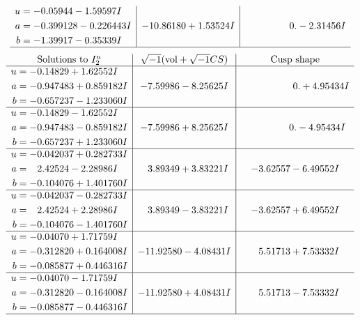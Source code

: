 \documentclass[1p]{elsarticle_modified}
\theoremstyle{definition}
\newcommand{\I}{\sqrt{-1}}
\begin{document}
$$\begin{array}{c|c|c}
\begin{aligned}
u &= -0.05944 - 1.59597 I \\
a &= -0.399128 - 0.226443 I \\
b &= -1.39917 - 0.35339 I\end{aligned}
 & -10.86180 + 1.53524 I & \phantom{-0.000000 } 0. - 2.31456 I\\
 \hline 
 \end{array}$$\newpage$$\begin{array}{c|c|c}  
\text{Solutions to }I^u_{2}& \I (\text{vol} + \sqrt{-1}CS) & \text{Cusp shape}\\
 \hline 
\begin{aligned}
u &= -0.14829 + 1.62552 I \\
a &= -0.947483 + 0.859182 I \\
b &= -0.657237 - 1.233060 I\end{aligned}
 & -7.59986 - 8.25625 I & \phantom{-0.000000 -}0. + 4.95434 I \\ \hline\begin{aligned}
u &= -0.14829 - 1.62552 I \\
a &= -0.947483 - 0.859182 I \\
b &= -0.657237 + 1.233060 I\end{aligned}
 & -7.59986 + 8.25625 I & \phantom{-0.000000 } 0. - 4.95434 I \\ \hline\begin{aligned}
u &= -0.042037 + 0.282733 I \\
a &= \phantom{-}2.42524 - 2.28986 I \\
b &= -0.104076 + 1.401760 I\end{aligned}
 & \phantom{-}3.89349 + 3.83221 I & -3.62557 - 6.49552 I \\ \hline\begin{aligned}
u &= -0.042037 - 0.282733 I \\
a &= \phantom{-}2.42524 + 2.28986 I \\
b &= -0.104076 - 1.401760 I\end{aligned}
 & \phantom{-}3.89349 - 3.83221 I & -3.62557 + 6.49552 I \\ \hline\begin{aligned}
u &= -0.04070 + 1.71759 I \\
a &= -0.312820 + 0.164008 I \\
b &= -0.085877 + 0.446316 I\end{aligned}
 & -11.92580 - 4.08431 I & \phantom{-}5.51713 + 7.53332 I \\ \hline\begin{aligned}
u &= -0.04070 - 1.71759 I \\
a &= -0.312820 - 0.164008 I \\
b &= -0.085877 - 0.446316 I\end{aligned}
 & -11.92580 + 4.08431 I & \phantom{-}5.51713 - 7.53332 I\\
 \hline 
 \end{array}$$\newpage
\end{document}

